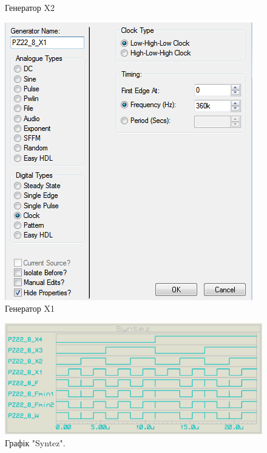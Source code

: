 \documentclass{article}
\begin{document}
\begin{normalsize}
\begin{figure}[H]
\begin{minipage}[h]{0.47\linewidth}
\begin{center}
				\caption{Генератор  X2}
			\end{center}
		\end{minipage}
		\hfill
		\begin{minipage}[h]{0.47\linewidth}
			\begin{center}
				\includegraphics[width=1\linewidth]{g1} 
				\caption{Генератор  X1}
			\end{center}
		\end{minipage}
	\end{figure}

	\begin{figure}[H]
		\centering
		\includegraphics[scale=0.3]{g}
		\caption{Графік "Syntez".}
	\end{figure}


\end{normalsize}
\end{document}
